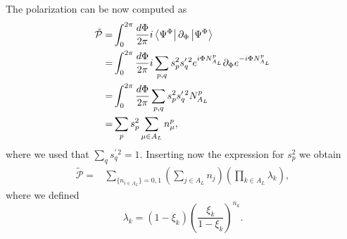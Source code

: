 \documentclass[twocolumn,amsmath,longbibliography,amssymb,superscriptaddress]{revtex4-1}
\begin{document}
The polarization can be now computed as
\begin{align}
\tilde{\mathcal{P}} =& \int_0^{2\pi} \frac{d\Phi}{2\pi}i\bra{\Psi^\Phi}\partial_\Phi\ket{\Psi^\Phi} \\
=& \int_0^{2\pi} \frac{d\Phi}{2\pi}i\sum_{p,q} s_p^2 s_q^{\prime \, 2} e^{i\Phi N_{A_L}^p}\partial_{\Phi}e^{-i\Phi  N_{A_L}^p}\\
=&\int_0^{2\pi} \frac{d\Phi}{2\pi}\sum_{p,q} s_p^2 s_q^{\prime \, 2}  N_{A_L}^p\\
=&\sum_{p} s_p^2 \sum_{\mu \in A_L}n^p_\mu,
\end{align}
where we used that $\sum_q s_q^{\prime \,2} = 1$. Inserting now the expression for $s_p^2$ we obtain
\begin{align}
\tilde{\mathcal{P}}=&\sum_{\{n_{i \in A_L}\} = 0,1} \left(\sum_{j\in A_{L}} n_j \right) \left(\prod_{k\in A_L} \lambda_k \right),
\end{align} 
where we defined
\begin{equation}
\lambda_k = (1- \xi_k)\left(\frac{\xi_k}{1-\xi_k} \right)^{n_k}.
\end{equation}
\end{document}
